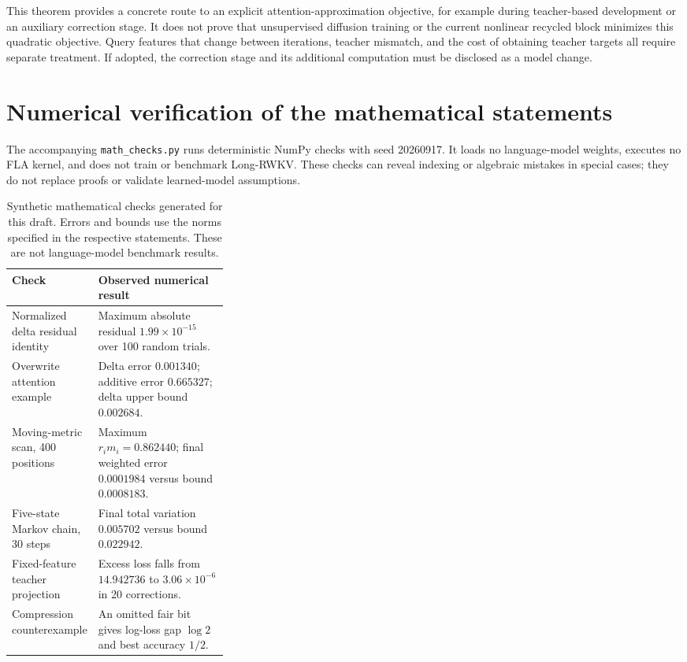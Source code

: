 \documentclass{article}
\theoremstyle{remark}\newtheorem{remark}[theorem]{Remark}
\begin{document}
This theorem provides a concrete route to an explicit attention-approximation objective, for example during teacher-based development or an auxiliary correction stage. It does not prove that unsupervised diffusion training or the current nonlinear recycled block minimizes this quadratic objective. Query features that change between iterations, teacher mismatch, and the cost of obtaining teacher targets all require separate treatment. If adopted, the correction stage and its additional computation must be disclosed as a model change.


\section{Numerical verification of the mathematical statements}
\label{app:checks}
The accompanying \texttt{math\_checks.py} runs deterministic NumPy checks with seed 20260917. It loads no language-model weights, executes no FLA kernel, and does not train or benchmark Long-RWKV. These checks can reveal indexing or algebraic mistakes in special cases; they do not replace proofs or validate learned-model assumptions.

\begin{table}[ht]
\centering\small
\caption{Synthetic mathematical checks generated for this draft. Errors and bounds use the norms specified in the respective statements. These are not language-model benchmark results.}
\begin{tabularx}{\linewidth}{@{}p{0.32\linewidth}Y@{}}
\toprule
Check & Observed numerical result \\
\midrule
Normalized delta residual identity & Maximum absolute residual $1.99\times10^{-15}$ over 100 random trials. \\
Overwrite attention example & Delta error $0.001340$; additive error $0.665327$; delta upper bound $0.002684$. \\
Moving-metric scan, 400 positions & Maximum $r_i m_i=0.862440$; final weighted error $0.0001984$ versus bound $0.0008183$. \\
Five-state Markov chain, 30 steps & Final total variation $0.005702$ versus bound $0.022942$. \\
Fixed-feature teacher projection & Excess loss falls from $14.942736$ to $3.06\times10^{-6}$ in 20 corrections. \\
Compression counterexample & An omitted fair bit gives log-loss gap $\log 2$ and best accuracy $1/2$. \\
\bottomrule
\end{tabularx}
\end{table}
\end{document}
